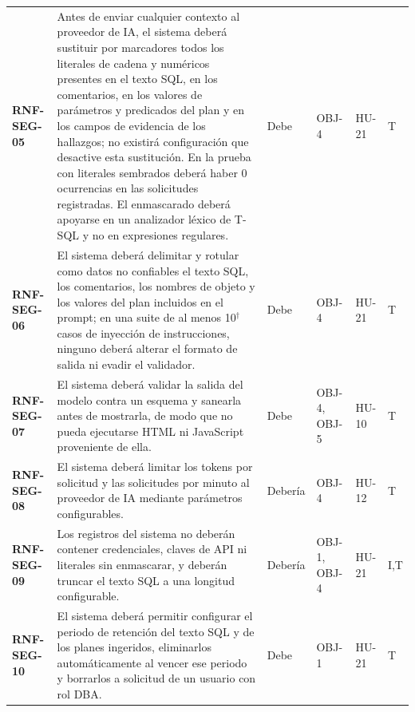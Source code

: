 \documentclass[11pt,a4paper]{report}
\begin{document}
\begin{footnotesize}
\begin{xltabular}{\linewidth}{@{}p{1.7cm}Xp{1.1cm}p{1.3cm}p{1.6cm}p{0.9cm}@{}}
\textbf{RNF-SEG-05} & Antes de enviar cualquier contexto al proveedor de IA, el sistema deberá sustituir por marcadores todos los literales de cadena y numéricos presentes en el texto SQL, en los comentarios, en los valores de parámetros y predicados del plan y en los campos de evidencia de los hallazgos; no existirá configuración que desactive esta sustitución. En la prueba con literales sembrados deberá haber 0 ocurrencias en las solicitudes registradas. El enmascarado deberá apoyarse en un analizador léxico de T-SQL y no en expresiones regulares. & Debe & OBJ-4 & HU-21 & T \\
\textbf{RNF-SEG-06} & El sistema deberá delimitar y rotular como datos no confiables el texto SQL, los comentarios, los nombres de objeto y los valores del plan incluidos en el prompt; en una suite de al menos 10$^{\dagger}$ casos de inyección de instrucciones, ninguno deberá alterar el formato de salida ni evadir el validador. & Debe & OBJ-4 & HU-21 & T \\
\textbf{RNF-SEG-07} & El sistema deberá validar la salida del modelo contra un esquema y sanearla antes de mostrarla, de modo que no pueda ejecutarse HTML ni JavaScript proveniente de ella. & Debe & OBJ-4, OBJ-5 & HU-10 & T \\
\textbf{RNF-SEG-08} & El sistema deberá limitar los tokens por solicitud y las solicitudes por minuto al proveedor de IA mediante parámetros configurables. & Debería & OBJ-4 & HU-12 & T \\
\textbf{RNF-SEG-09} & Los registros del sistema no deberán contener credenciales, claves de API ni literales sin enmascarar, y deberán truncar el texto SQL a una longitud configurable. & Debería & OBJ-1, OBJ-4 & HU-21 & I,T \\
\textbf{RNF-SEG-10} & El sistema deberá permitir configurar el periodo de retención del texto SQL y de los planes ingeridos, eliminarlos automáticamente al vencer ese periodo y borrarlos a solicitud de un usuario con rol DBA. & Debe & OBJ-1 & HU-21 & T \\

\end{xltabular}
\end{footnotesize}
\end{document}
